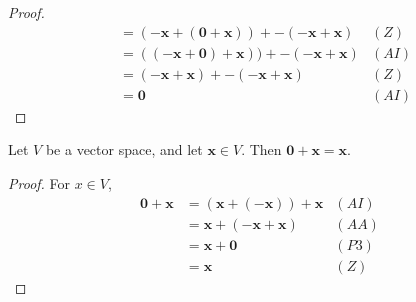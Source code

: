 \begin{itemize}
\begin{proposition}
\begin{proof}
\begin{align*}
                &= (-\bm{x}+(\bm{0} + \bm{x})) +-(-\bm{x}+\bm{x}) & (Z) \\ 
                &= ((-\bm{x}+\bm{0})+\bm{x})) + -(-\bm{x}+\bm{x}) & (AI) \\
                &=  (-\bm{x}+\bm{x})+-(-\bm{x}+\bm{x})  & (Z) \\ 
                &= \bm{0} & (AI)
            \end{align*}
        \end{proof}
    \end{proposition}
    \begin{proposition}
        Let $V$ be a vector space, and let $\bm{x}\in V$. Then $\bm{0}+\bm{x}=\bm{x}$.
        \begin{proof}
            For $x\in V$,
            \begin{align*}
                \bm{0} + \bm{x} &= (\bm{x}+(-\bm{x}))+ \bm{x} & (AI) \\ 
                &= \bm{x} + (-\bm{x} + \bm{x}) & (AA) \\ 
                &= \bm{x} + \bm{0} & (P3) \\
                &= \bm{x} & (Z)
            \end{align*}
        \end{proof}
    \end{proposition}
\end{itemize}